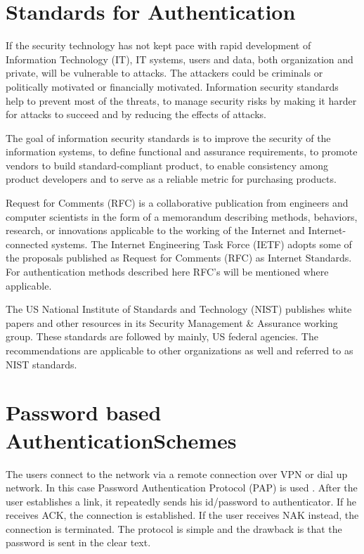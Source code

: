 \begin{multicols}{2}
\section{Standards for Authentication}

\vskip -3pt

If the security technology has not kept pace with rapid development of Information Technology (IT), IT systems, users and data, both organization and private, will be vulnerable to attacks. The attackers could be criminals or politically motivated or financially motivated. Information security standards help to prevent most of the threats, to manage security risks by making it harder for attacks to succeed and by reducing the effects of attacks.

The goal of information security standards is to improve the security of the information systems, to define functional and assurance requirements, to promote vendors to build standard-compliant product, to enable consistency among product developers and to serve as a reliable metric for purchasing products.

Request for Comments (RFC) is a collaborative publication from engineers and computer scientists in the form of a memorandum describing methods, behaviors, research, or innovations applicable to the working of the Internet and Internet-connected systems. The Internet Engineering Task Force (IETF) adopts some of the proposals published as Request for Comments (RFC) as Internet Standards. For authentication methods described here RFC's will be mentioned where applicable.

The US National Institute of Standards and Technology (NIST) publishes white papers and other resources in its Security Management \& Assurance working group. These standards are followed by mainly, US federal agencies. The recommendations are applicable to other organizations as well and referred to as NIST standards.\\[-20pt]

\section{Password based Authentication\hfill\break Schemes}

\vskip -3pt

The users connect to the network via a remote connection over VPN or dial up network. In this case Password Authentication Protocol (PAP) is used \cite{chap2-key4}. After the user establishes a link, it repeatedly sends his id/password to authenticator. If he receives ACK, the connection is established. If the user receives NAK instead, the connection is terminated. The protocol is simple and the drawback is that the password is sent in the clear text.


\end{multicols}
